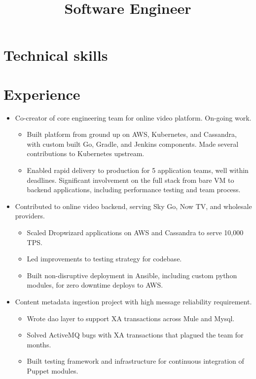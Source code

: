 \documentclass[11pt,a4paper,roman]{moderncv}
\title{Software Engineer}
\begin{document}
\makecvtitle

\section{Technical skills}

\section{Experience}

\begin{itemize}
\item Co-creator of core engineering team for online video platform. On-going work.
  \begin{itemize}
  \item Built platform from ground up on AWS, Kubernetes, and Cassandra, with custom built Go, Gradle, and Jenkins components. Made several contributions to Kubernetes upstream.
  \item Enabled rapid delivery to production for 5 application teams, well within deadlines. Significant involvement on the full stack from bare VM to backend applications, including performance testing and team process.
  \end{itemize}
\item Contributed to online video backend, serving Sky Go, Now TV, and wholesale providers.
  \begin{itemize}
  \item Scaled Dropwizard applications on AWS and Cassandra to serve 10,000 TPS.
  \item Led improvements to testing strategy for codebase.
  \item Built non-disruptive deployment in Ansible, including custom python modules, for zero downtime deploys to AWS.
  \end{itemize}
\item Content metadata ingestion project with high message reliability requirement.
  \begin{itemize}
  \item Wrote dao layer to support XA transactions across Mule and Mysql.
  \item Solved ActiveMQ bugs with XA transactions that plagued the team for months.
  \item Built testing framework and infrastructure for continuous integration of Puppet modules.
  \end{itemize}
\end{itemize}
\end{document}
